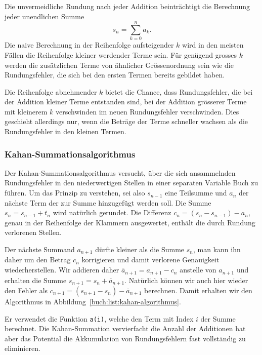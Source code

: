 Die unvermeidliche Rundung nach jeder Addition beinträchtigt die Berechnung
jeder unendlichen Summe
\[
s_n
=
\sum_{k=0}^n a_k.
\]
Die naive Berechnung in der Reihenfolge aufsteigender $k$ wird in den
meisten Fällen die Reihenfolge kleiner werdender Terme sein.
Für genügend grosses $k$ werden die zusätzlichen Terme von ähnlicher 
Grössenordnung sein wie die Rundungsfehler, die sich bei den ersten
Termen bereits gebildet haben.

Die Reihenfolge abnehmender $k$ bietet die Chance, dass Rundungsfehler,
die bei der Addition kleiner Terme entstanden sind, bei der Addition
grösserer Terme mit kleinerem $k$ verschwinden im neuen Rundungsfehler
verschwinden.
Dies geschieht allerdings nur, wenn die Beträge der Terme schneller 
wachsen als die Rundungsfehler in den kleinen Termen.

\subsubsection{Kahan-Summationsalgorithmus}
Der Kahan-Summationsalgorithmus versucht, über die sich ansammelnden
Rundungsfehler in den niederwertigen Stellen in einer separaten 
Variable Buch zu führen.
Um das Prinzip zu verstehen, sei also $s_{n-1}$ eine Teilsumme und $a_n$ der
nächste Term der zur Summe hinzugefügt werden soll. 
Die Summe $s_n=s_{n-1} + t_n$ wird natürlich gerundet.
Die Differenz $c_n = (s_n - s_{n-1}) - a_n$, genau in der Reihenfolge
der Klammern ausgewertet, enthält die durch Rundung verlorenen Stellen.

Der nächste Summand $a_{n+1}$ dürfte kleiner als die Summe $s_{n}$, 
man kann ihn daher um den Betrag $c_n$ korrigieren und damit verlorene
Genauigkeit wiederherstellen.
Wir addieren daher $\bar a_{n+1} = a_{n+1}-c_n$ anstelle von $a_{n+1}$
und erhalten die Summe $s_{n+1} = s_n + \bar{a}_{n+1}$.
Natürlich können wir auch hier wieder den Fehler als
$c_{n+1} = (s_{n+1} - s_{n}) - \bar{a}_{n+1}$ berechnen.
Damit erhalten wir den Algorithmus in
Abbildung~\ref{buch:list:kahan-algorithmus}.

Er verwendet die Funktion \texttt{a(i)}, welche den Term mit Index $i$
der Summe berechnet.
Die Kahan-Summation vervierfacht die Anzahl der Additionen hat aber das
Potential die Akkumulation von Rundungsfehlern fast vollständig zu 
eliminieren.

